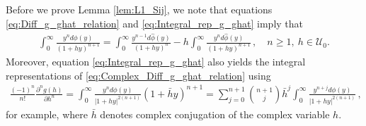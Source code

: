 \documentclass[english,12pt,jmp,graphicx]{revtex4-1}
\newcommand{\ph}{\hat{\phi}}
\begin{document}
Before we prove Lemma \ref{lem:L1_Sij}, we note that equations
\eqref{eq:Diff_g_ghat_relation} and \eqref{eq:Integral_rep_g_ghat}
imply that
%
\begin{align}\label{eq:Diff_g_ghat_relation_Integral}
  \int_0^\infty \frac{y^nd\phi(y)}{(1+hy)^{n+1}}=\int_0^\infty\frac{y^{n-1}d\ph(y)}{(1+hy)^n} 
                                -h \int_0^\infty\frac{y^nd\ph(y)}{(1+hy)^{n+1}}
  \,, \quad   n\geq1, \ h\in\mathcal{U}_0.               
\end{align}
%
Moreover, equation \eqref{eq:Integral_rep_g_ghat} also yields the integral
representations of \eqref{eq:Complex_Diff_g_ghat_relation} using
%
\begin{align}\label{eq:Complex_Diff_g}
  \frac{(-1)^n}{n!}\frac{\partial^ng(h)}{\partial h^n}
   =\int_0^\infty\frac{y^nd\phi(y)}{|1+hy|^{2(n+1)}}(1+\bar{h}y)^{n+1}
   =\sum_{j=0}^{n+1}{n+1 \choose j}\bar{h}^j
                 \int_0^\infty\frac{y^{n+j}d\phi(y)}{|1+hy|^{2(n+1)}}\,,               
\end{align}
%
for example, where $\bar{h}$ denotes complex conjugation of the
complex variable $h$.
\end{document}
